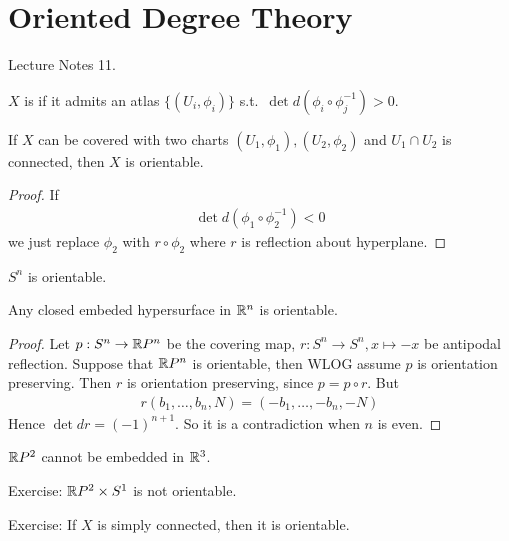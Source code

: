 \documentclass[12pt,class=article,crop=false]{standalone}
\begin{document}
\section{Oriented Degree Theory}
Lecture Notes 11.
\begin{defn}
$ X$ is   if it admits an atlas $ \{(U_i, \phi_i)\} $ s.t.\ $ \det d(\phi_i \circ \phi_j ^{-1}) >0$.
\end{defn}

\begin{prop}
If $ X$ can be covered with two charts  $ (U_1, \phi_1),(U_2, \phi_2)$ and $ U_1 \cap U_2$ is connected, then $ X$ is orientable.
\end{prop}
\begin{proof}
If
\begin{align*}
	\det d(\phi_1 \circ \phi_2^{-1})<0 
\end{align*}
we just replace $ \phi_2$ with $ r \circ \phi_2$ where $ r$ is reflection about hyperplane.
\end{proof}
\begin{coro}
$ S^{n}$ is orientable.
\end{coro}

\begin{prop}
Any closed embeded hypersurface in $ \mathbb{R}^{n}$ is orientable.
\end{prop}

\begin{proof}
Let $ p: S^{n} \to \mathbb{R} P^{n}$ be the covering map, $ r: S^{n} \to S^{n}, x\mapsto -x$ be antipodal reflection. Suppose that $ \mathbb{R} P^{n}$ is orientable, then WLOG assume $ p$ is orientation preserving. Then  $ r$ is orientation preserving, since  $ p = p \circ r$. But
\begin{align*}
	r(b_1,\ldots,b_{n},N) = (-b_1,\ldots,-b_{n},-N)
\end{align*}
Hence $ \det dr = (-1)^{n+1}$. So it is a contradiction when $ n$ is even.
\end{proof}
\begin{coro}
$ \mathbb{R} P^2$ cannot be embedded in $ \mathbb{R}^3$.
\end{coro}
Exercise: $ \mathbb{R} P^2 \times S^{1}$ is not orientable.

Exercise: If $ X$ is simply connected, then it is orientable.
\end{document}
